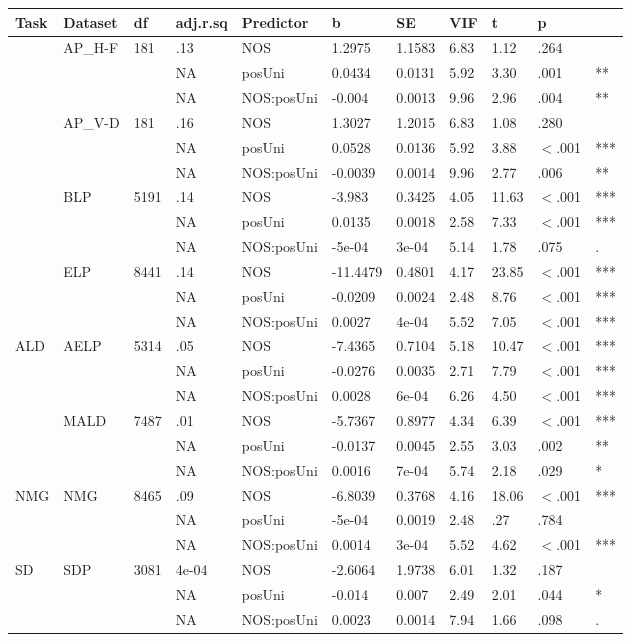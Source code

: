 \begin{table}[ht]
\centering
\begingroup\normalsize
\begin{tabular}{lllllllllll}
  \hline
Task & Dataset & df & adj.r.sq & Predictor & b & SE & VIF & t & p &  \\ 
  \hline
 & AP\_H-F & 181 & .13 & NOS & 1.2975 & 1.1583 & 6.83 & 1.12 & .264 &   \\ 
   &  &  & NA & posUni & 0.0434 & 0.0131 & 5.92 & 3.30 & .001 & ** \\ 
   &  &  & NA & NOS:posUni & -0.004 & 0.0013 & 9.96 & 2.96 & .004 & ** \\ 
   & AP\_V-D & 181 & .16 & NOS & 1.3027 & 1.2015 & 6.83 & 1.08 & .280 &   \\ 
   &  &  & NA & posUni & 0.0528 & 0.0136 & 5.92 & 3.88 & $<$.001 & *** \\ 
   &  &  & NA & NOS:posUni & -0.0039 & 0.0014 & 9.96 & 2.77 & .006 & ** \\ 
   & BLP & 5191 & .14 & NOS & -3.983 & 0.3425 & 4.05 & 11.63 & $<$.001 & *** \\ 
   &  &  & NA & posUni & 0.0135 & 0.0018 & 2.58 & 7.33 & $<$.001 & *** \\ 
   &  &  & NA & NOS:posUni & -5e-04 & 3e-04 & 5.14 & 1.78 & .075 & . \\ 
   & ELP & 8441 & .14 & NOS & -11.4479 & 0.4801 & 4.17 & 23.85 & $<$.001 & *** \\ 
   &  &  & NA & posUni & -0.0209 & 0.0024 & 2.48 & 8.76 & $<$.001 & *** \\ 
   &  &  & NA & NOS:posUni & 0.0027 & 4e-04 & 5.52 & 7.05 & $<$.001 & *** \\ 
  ALD & AELP & 5314 & .05 & NOS & -7.4365 & 0.7104 & 5.18 & 10.47 & $<$.001 & *** \\ 
   &  &  & NA & posUni & -0.0276 & 0.0035 & 2.71 & 7.79 & $<$.001 & *** \\ 
   &  &  & NA & NOS:posUni & 0.0028 & 6e-04 & 6.26 & 4.50 & $<$.001 & *** \\ 
   & MALD & 7487 & .01 & NOS & -5.7367 & 0.8977 & 4.34 & 6.39 & $<$.001 & *** \\ 
   &  &  & NA & posUni & -0.0137 & 0.0045 & 2.55 & 3.03 & .002 & ** \\ 
   &  &  & NA & NOS:posUni & 0.0016 & 7e-04 & 5.74 & 2.18 & .029 & * \\ 
  NMG & NMG & 8465 & .09 & NOS & -6.8039 & 0.3768 & 4.16 & 18.06 & $<$.001 & *** \\ 
   &  &  & NA & posUni & -5e-04 & 0.0019 & 2.48 & .27 & .784 &   \\ 
   &  &  & NA & NOS:posUni & 0.0014 & 3e-04 & 5.52 & 4.62 & $<$.001 & *** \\ 
  SD & SDP & 3081 & 4e-04 & NOS & -2.6064 & 1.9738 & 6.01 & 1.32 & .187 &   \\ 
   &  &  & NA & posUni & -0.014 & 0.007 & 2.49 & 2.01 & .044 & * \\ 
   &  &  & NA & NOS:posUni & 0.0023 & 0.0014 & 7.94 & 1.66 & .098 & . \\ 
   \hline
\end{tabular}
\endgroup
\end{table}
